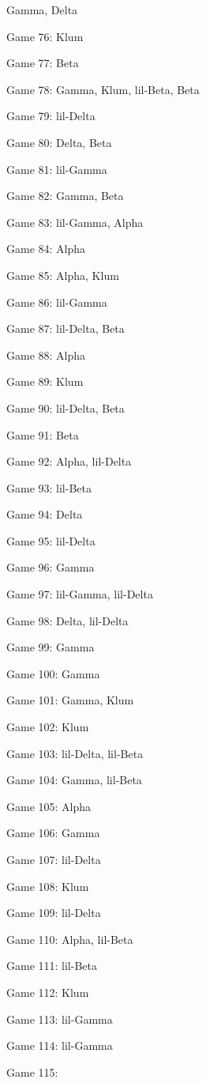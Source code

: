 \documentclass{article}
\begin{document}
\begin{multicols}{3}
\begin{compactitem}
Gamma, Delta
\item Game 76:
Klum
\item Game 77:
Beta
\item Game 78:
Gamma, Klum, lil-Beta, Beta
\item Game 79:
lil-Delta
\item Game 80:
Delta, Beta
\item Game 81:
lil-Gamma
\item Game 82:
Gamma, Beta
\item Game 83:
lil-Gamma, Alpha
\item Game 84:
Alpha
\item Game 85:
Alpha, Klum
\item Game 86:
lil-Gamma
\item Game 87:
lil-Delta, Beta
\item Game 88:
Alpha
\item Game 89:
Klum
\item Game 90:
lil-Delta, Beta
\item Game 91:
Beta
\item Game 92:
Alpha, lil-Delta
\item Game 93:
lil-Beta
\item Game 94:
Delta
\item Game 95:
lil-Delta
\item Game 96:
Gamma
\item Game 97:
lil-Gamma, lil-Delta
\item Game 98:
Delta, lil-Delta
\item Game 99:
Gamma
\item Game 100:
Gamma
\item Game 101:
Gamma, Klum
\item Game 102:
Klum
\item Game 103:
lil-Delta, lil-Beta
\item Game 104:
Gamma, lil-Beta
\item Game 105:
Alpha
\item Game 106:
Gamma
\item Game 107:
lil-Delta
\item Game 108:
Klum
\item Game 109:
lil-Delta
\item Game 110:
Alpha, lil-Beta
\item Game 111:
lil-Beta
\item Game 112:
Klum
\item Game 113:
lil-Gamma
\item Game 114:
lil-Gamma
\item Game 115:

\end{compactitem}
\end{multicols}
\end{document}
